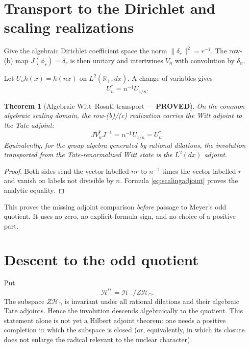 \documentclass[11pt]{article}
\newcommand{\PROVED}{\textcolor{green!40!black}{\textbf{PROVED}}}
\newtheorem{theorem}{Theorem}
\begin{document}
\section{Transport to the Dirichlet and scaling realizations}

Give the algebraic Dirichlet coefficient space the norm
$\|\delta_r\|^2=r^{-1}$.  The row-(b) map $J(\phi_r)=\delta_r$ is then
unitary and intertwines $V_n$ with convolution by $\delta_n$.

Let $U_nh(x)=h(nx)$ on $L^2(\mathbb R_+,dx)$.  A change of variables gives
\begin{equation}\label{eq:scalingadjoint}
 U_n^*=n^{-1}U_{1/n}.
\end{equation}

\begin{theorem}[Algebraic Witt--Rosati transport --- \PROVED]
On the common algebraic scaling domain, the row-(b)/(c) realization carries
the Witt adjoint to the Tate adjoint:
\[
 J V_n^\dagger J^{-1}=n^{-1}U_{1/n}=U_n^*.
\]
Equivalently, for the group algebra generated by rational dilations, the
involution transported from the Tate-renormalized Witt state is the
$L^2(dx)$ adjoint.
\end{theorem}

\begin{proof}
Both sides send the vector labelled $nr$ to $n^{-1}$ times the vector
labelled $r$ and vanish on labels not divisible by $n$.  Formula
\eqref{eq:scalingadjoint} proves the analytic equality.
\end{proof}

This proves the missing adjoint comparison \emph{before} passage to Meyer's
odd quotient.  It uses no zero, no explicit-formula sign, and no choice of a
positive part.

\section{Descent to the odd quotient}

Put
\[
 \mathcal H_-^0=\mathcal H_-/Z\mathcal H_\cap.
\]
The subspace $Z\mathcal H_\cap$ is invariant under all rational dilations and
their algebraic Tate adjoints.  Hence the involution descends algebraically
to the quotient.  This statement alone is not yet a Hilbert adjoint theorem:
one needs a positive completion in which the subspace is closed (or,
equivalently, in which its closure does not enlarge the radical relevant to
the nuclear character).
\end{document}

